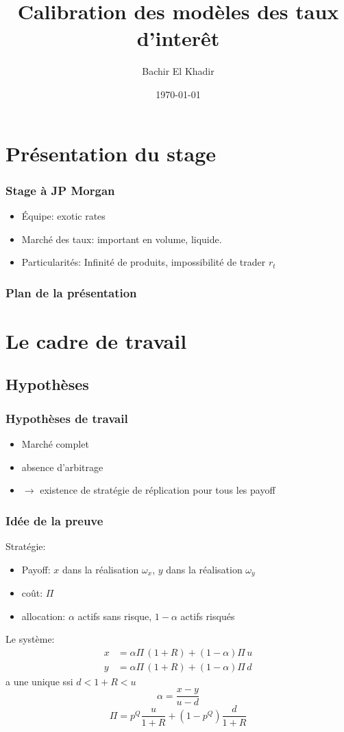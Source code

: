\documentclass{beamer}
\title[Calibration des modèles de taux d'interêt]{Calibration des modèles des taux d'interêt}
\author{Bachir El Khadir}
\institute[Ecole Polytechnique]
{
Ecole Polytechnique \\
\medskip
\textit{bachir.el-khadir@polytechnique.edu}
}
\date{\today}
\begin{document}
\begin{frame}
\titlepage %
\end{frame}



\section{Présentation du stage}
\begin{frame}
\frametitle{Stage à JP Morgan}
\begin{itemize}
\item Équipe: exotic rates
\item Marché des taux: important en volume, liquide.
\item Particularités: Infinité de produits, impossibilité de trader $r_t$
\end{itemize}
\end{frame}

\begin{frame}
\frametitle{Plan de la présentation} 
\tableofcontents 
\end{frame}

\section{Le cadre de travail}
\subsection{Hypothèses}
\begin{frame}
\frametitle{Hypothèses de travail}
\begin{itemize}
\item Marché complet
\item absence d'arbitrage
\item $\rightarrow$ existence de stratégie de réplication pour  tous les payoff
\end{itemize}
\end{frame}

\begin{frame}
  \frametitle{Idée de la preuve}
   {
    
    Stratégie:
    \begin{itemize}
    \item Payoff: $x$ dans la réalisation $\omega_x$, $y$ dans la réalisation $\omega_y$ 
    \item coût: $\Pi$
    \item allocation: $\alpha$ actifs sans risque, $1-\alpha$ actifs risqués
    \end{itemize}
  }
   {
    Le système:
  \begin{align*}
  x &= \alpha \Pi \, (1+R) +(1-\alpha) \Pi \, u \\
  y &= \alpha \Pi \, (1+R) + (1-\alpha) \Pi \, d
  \end{align*}
  a une  unique ssi $d < 1+R < u$
  $$ \alpha  = \frac{x-y}{u-d}$$
  $$\Pi = p^Q \frac{u}{1+R} + (1-p^Q) \frac{d}{1+R}$$
}
\end{frame}
\end{document}
